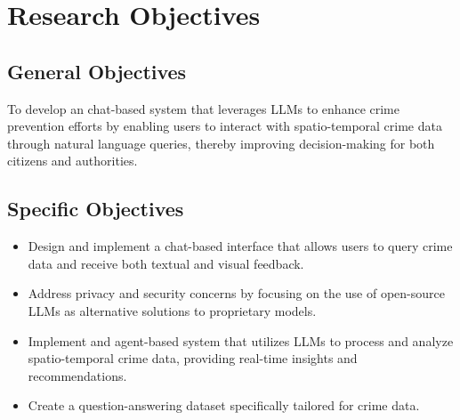 \section{Research Objectives} %

\subsection{General Objectives}
To develop an chat-based system that leverages LLMs to enhance crime prevention efforts by enabling users to interact with spatio-temporal crime data through natural language queries, thereby improving decision-making for both citizens and authorities.

\subsection{Specific Objectives}
\begin{itemize}
    \item Design and implement a chat-based interface that allows users to query crime data and receive both textual and visual feedback.
    \item Address privacy and security concerns by focusing on the use of open-source LLMs as alternative solutions to proprietary models.
    \item Implement and agent-based system that utilizes LLMs to process and analyze spatio-temporal crime data, providing real-time insights and recommendations.
    \item Create a question-answering dataset specifically tailored for crime data.
\end{itemize}

